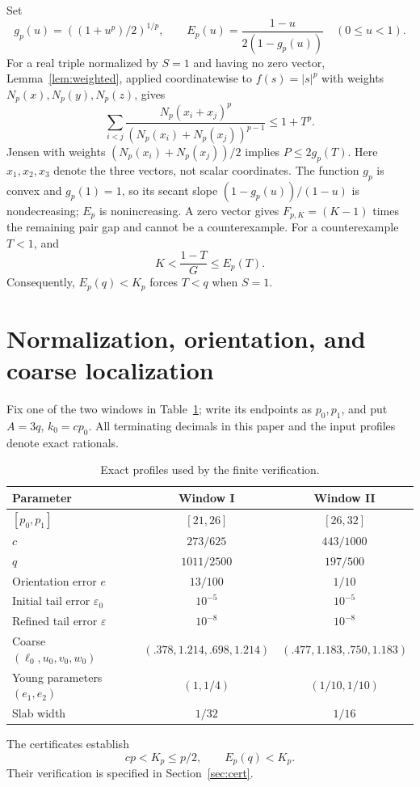 \documentclass[11pt,a4paper]{article}
\theoremstyle{remark}\newtheorem{remark}[theorem]{Remark}
\newcommand{\Np}{N_p}\newcommand{\F}{F_{p,K}}
\begin{document}
Set
\begin{equation}\label{eq:envelope}
g_p(u)=((1+u^p)/2)^{1/p},\qquad
E_p(u)=\frac{1-u}{2(1-g_p(u))}\quad(0\le u<1).
\end{equation}
For a real triple normalized by $S=1$ and having no zero vector,
Lemma~\ref{lem:weighted}, applied coordinatewise to $f(s)=|s|^p$
with weights $\Np(x),\Np(y),\Np(z)$, gives
\[
\sum_{i<j}\frac{\Np(x_i+x_j)^p}{(\Np(x_i)+\Np(x_j))^{p-1}}\le1+T^p.
\]
Jensen with weights $(\Np(x_i)+\Np(x_j))/2$ implies $P\le2g_p(T)$.
Here $x_1,x_2,x_3$ denote the three vectors, not scalar coordinates.
The function $g_p$ is convex and $g_p(1)=1$, so its secant slope
$(1-g_p(u))/(1-u)$ is nondecreasing; $E_p$ is nonincreasing.
A zero vector gives $\F=(K-1)$ times the remaining pair gap and cannot
be a counterexample. For a counterexample $T<1$, and
\begin{equation}\label{eq:envelope-use}
K<\frac{1-T}{G}\le E_p(T).
\end{equation}
Consequently, $E_p(q)<K_p$ forces $T<q$ when $S=1$.

\section{Normalization, orientation, and coarse localization}\label{sec:coarse}
Fix one of the two windows in Table~\ref{tab:profiles}; write its endpoints
as $p_0,p_1$, and put $A=3q$, $k_0=cp_0$. All terminating decimals
in this paper and the input profiles denote exact rationals.
\begin{table}[ht]
\centering\small
\begin{tabular}{lcc}\toprule
Parameter & Window I & Window II\\\midrule
$[p_0,p_1]$ & $[21,26]$ & $[26,32]$\\
$c$ & $273/625$ & $443/1000$\\
$q$ & $1011/2500$ & $197/500$\\
Orientation error $e$ & $13/100$ & $1/10$\\
Initial tail error $\varepsilon_0$ & $10^{-5}$ & $10^{-5}$\\
Refined tail error $\varepsilon$ & $10^{-8}$ & $10^{-8}$\\
Coarse $(\ell_0,u_0,v_0,w_0)$ & $(.378,1.214,.698,1.214)$ & $(.477,1.183,.750,1.183)$\\
Young parameters $(e_1,e_2)$ & $(1,1/4)$ & $(1/10,1/10)$\\
Slab width & $1/32$ & $1/16$\\\bottomrule
\end{tabular}
\caption{Exact profiles used by the finite verification.}\label{tab:profiles}
\end{table}
The certificates establish
\begin{equation}\label{eq:Kbounds} cp<K_p\le p/2,\qquad E_p(q)<K_p.\end{equation}
Their verification is specified in Section~\ref{sec:cert}.
\end{document}
